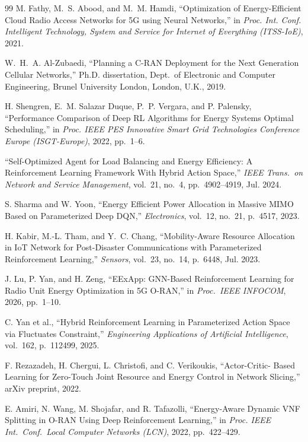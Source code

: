 \begin{thebibliography}{99}
M. Fathy, M.~S. Abood, and M.~M. Hamdi, ``Optimization of Energy-Efficient
Cloud Radio Access Networks for 5G using Neural Networks,'' in \emph{Proc.
Int. Conf. Intelligent Technology, System and Service for Internet of
Everything (ITSS-IoE)}, 2021.

W.~H.~A. Al-Zubaedi, ``Planning a C-RAN Deployment for the Next Generation
Cellular Networks,'' Ph.D. dissertation, Dept.\ of Electronic and Computer
Engineering, Brunel University London, London, U.K., 2019.

H. Shengren, E.~M. Salazar Duque, P.~P. Vergara, and P. Palensky,
``Performance Comparison of Deep RL Algorithms for Energy Systems Optimal
Scheduling,'' in \emph{Proc. IEEE PES Innovative Smart Grid Technologies
Conference Europe (ISGT-Europe)}, 2022, pp.~1--6.

``Self-Optimized Agent for Load Balancing and Energy Efficiency: A
Reinforcement Learning Framework With Hybrid Action Space,'' \emph{IEEE
Trans.\ on Network and Service Management}, vol.~21, no.~4, pp.~4902--4919,
Jul. 2024.

S. Sharma and W. Yoon, ``Energy Efficient Power Allocation in Massive MIMO
Based on Parameterized Deep DQN,'' \emph{Electronics}, vol.~12, no.~21,
p.~4517, 2023.

H. Kabir, M.-L. Tham, and Y.~C. Chang, ``Mobility-Aware Resource Allocation
in IoT Network for Post-Disaster Communications with Parameterized
Reinforcement Learning,'' \emph{Sensors}, vol.~23, no.~14, p.~6448,
Jul. 2023.

J. Lu, P. Yan, and H. Zeng, ``EExApp: GNN-Based Reinforcement Learning for
Radio Unit Energy Optimization in 5G O-RAN,'' in \emph{Proc.\ IEEE
INFOCOM}, 2026, pp.~1--10.

C. Yan et al., ``Hybrid Reinforcement Learning in Parameterized Action
Space via Fluctuates Constraint,'' \emph{Engineering Applications of
Artificial Intelligence}, vol.~162, p.~112499, 2025.

F. Rezazadeh, H. Chergui, L. Christofi, and C. Verikoukis, ``Actor-Critic-
Based Learning for Zero-Touch Joint Resource and Energy Control in Network
Slicing,'' arXiv preprint, 2022.

E. Amiri, N. Wang, M. Shojafar, and R. Tafazolli, ``Energy-Aware Dynamic
VNF Splitting in O-RAN Using Deep Reinforcement Learning,'' in \emph{Proc.
IEEE Int.\ Conf.\ Local Computer Networks (LCN)}, 2022, pp.~422--429.


\end{thebibliography}
